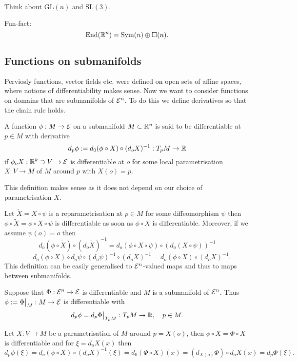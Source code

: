 \begin{exercise}
	Think about $\mathrm{GL}(n)$ and SL$(3)$.
\end{exercise}

Fun-fact:
	\[ \mathrm{End}(\mathbb R^n) = \mathrm{Sym}(n) \oplus \square(n). \]
	
\subsection{Functions on submanifolds}

Perviosly functions, vector fields etc. were defined on open sets of affine spaces, where notions of differentiability makes sense.
Now we want to consider functions on domains that are submanifolds of $\mathcal E^n$. To do this we define derivatives so that the chain rule holds.

\begin{definition}
	A function $\phi: M \to \mathcal E$ on a submanifold $M \subset \mathbb R^n$ is said to be differentiable at $p \in M$ with derivative
		\[ d_p\phi := d_0(\phi \circ X) \circ (d_oX)^{-1} : T_pM \to \mathbb R  \]
	if $\phi_oX : \mathbb R^k \supset V \to \mathcal E$ is differentiable at $o$ for some local parametrisation $X: V \to M$ of $M$ around $p$ with $X(o)=p$.
\end{definition}

\begin{remark}
	This definition makes sense as it does not depend on our choice of parametrisation $X$.
	
	Let $\tilde X= X \circ \psi$ is a reparametrisation at $p \in M$ for some diffeomorphism $\psi$ then $\phi \circ\tilde X = \phi  \circ  X\circ\psi$ is differentiable as soon as $\phi \circ X$ is differentiable. Moreover, if we assume $\psi(o)=o$ then 
		\[ d_o(\phi \circ \tilde X) \circ (d_o\tilde X)^{-1}
			= d_o(\phi \circ X \circ \psi) \circ (d_o(X \circ \psi))^{-1}
			 \]
		\[ = d_o(\phi \circ X) \circ d_o\psi \circ (d_o\psi)^{-1} \circ (d_oX)^{-1}
		= d_o(\phi \circ X)  \circ (d_oX)^{-1}. \]
	This definition can be easily generalised to $\mathcal E^n$-valued maps and thus to maps between submanifolds.
\end{remark}

\begin{remark}
	Suppose that $\Phi: \mathcal E^n \to \mathcal E$ is differentiable and $M$ is a submanifold of $\mathcal E^n$. Thus $\phi:= \Phi \big|_M :M \to \mathcal E$ is differentiable with
		\[ d_p\phi = d_p\Phi \big|_{T_pM} : T_pM \to \mathbb R, \quad p \in M. \] 
	
	Let $X: V \to M$ be a parametrisation of $M$ around $p=X(o)$, then $\phi \circ X = \Phi \circ X$ is differentiable and for $\xi = d_oX(x)$ then
		\[ d_p\phi(\xi) = d_o(\phi \circ X) \circ (d_oX)^{-1}(\xi)
			= d_0(\Phi \circ X)(x) = (d_{X(o)} \Phi) \circ d_oX(x)
			= d_p\Phi(\xi). \]  
\end{remark}


